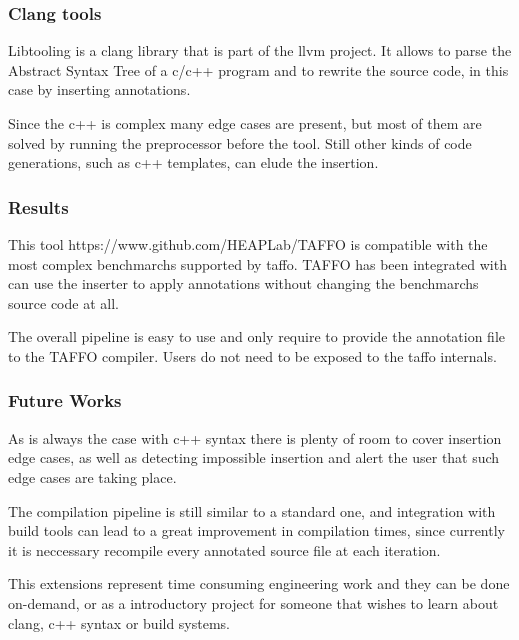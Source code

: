 \documentclass{beamer}
\begin{document}
\begin{frame}[fragile]
	\frametitle{Clang tools}
	\begin{block}{}
		Libtooling is a clang library that is part of the llvm project. It allows to parse the Abstract Syntax Tree of a c/c++ program and to rewrite the source code, in this case by inserting annotations. 
	\end{block}

	\begin{block}{}
		Since the c++ is complex many edge cases are present, but most of them are solved by running the preprocessor before the tool. Still other kinds of code generations, such as c++ templates, can elude the insertion.
	\end{block}
	

\end{frame}
\begin{frame}[fragile]
	\frametitle{Results}
	\begin{block}{}
		This tool https://www.github.com/HEAPLab/TAFFO is compatible with the most complex benchmarchs supported by taffo. TAFFO has been integrated with can use the inserter to apply annotations without changing the benchmarchs source code at all.
	\end{block}
	\begin{block}{}
		The overall pipeline is easy to use and only require to provide the annotation file to the TAFFO compiler. Users do not need to be exposed to the taffo internals.
	\end{block}


\end{frame}

\begin{frame}[fragile]
	\frametitle{Future Works}
	\begin{block}{}
		As is always the case with c++ syntax there is plenty of room to cover insertion edge cases, as well as detecting impossible insertion and alert the user that such edge cases are taking place. 
	\end{block}
	\begin{block}{}
		The compilation pipeline is still similar to a standard one, and integration with build tools can lead to a great improvement in compilation times, since currently it is neccessary recompile every annotated source file at each iteration.
	\end{block}
	\begin{block}{}
		This extensions represent time consuming engineering work and they can be done on-demand, or as a introductory project for someone that wishes to learn about clang, c++ syntax or build systems.
	\end{block}
\end{frame}
\end{document}
